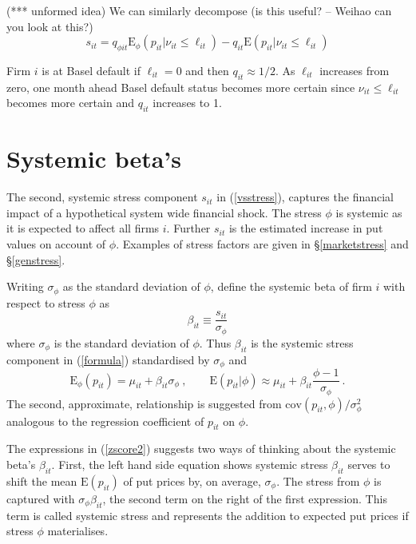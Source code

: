 \documentclass[authoryear]{elsarticle}
\newcommand{\E}{\mathrm{E}}
\newcommand{\cov}{\mathrm{cov}}
\newcommand{\Es}{\E_\phi}
\newcommand{\eref}[1]{(\ref{#1})}
\newcommand{\sref}[1]{\S\ref{#1}}
\newcommand{\cq}{\ , \qquad}
\newcommand{\be}[1]{\begin{equation}\label{#1}}
\newcommand{\ee}{\end{equation}}
\begin{document}
(*** unformed idea)   We can similarly decompose   (is this useful? -- Weihao can you look at this?)
$$
s_{it} = q_{\phi it}\E_\phi(p_{it}|\nu_{it}\le \ell_{it})-q_{it}\E(p_{it}|\nu_{it} \le \ell_{it})
$$      

Firm $i$ is at Basel default if $\ell_{it}=0$  and then  $q_{it}\approx 1/2$.   As  $\ell_{it}$ increases from zero,  one month ahead Basel default status  becomes more certain since $\nu_{it}\le \ell_{it}$ becomes more certain and $q_{it}$ increases to 1. 

   

  
   
\section{Systemic beta's}

The second, systemic stress component $s_{it}$ in  \eref{vsstress},  captures the financial impact of a  hypothetical system wide financial shock.   The stress $\phi$ is systemic as it is expected to affect all firms $i$.  Further $s_{it}$ is the estimated   increase in put values on account of  $\phi$.   Examples of stress factors are given in \sref{marketstress} and \sref{genstress}.
 

Writing  $\sigma_{\phi}$ as the standard deviation of $\phi$,  define the systemic beta of firm $i$ with respect to stress $\phi$ as
\be{zscore}
\beta_{it}\equiv \frac{s_{it}}{\sigma_\phi}
\ee
where  $\sigma_\phi$ is the standard deviation of $\phi$.   Thus $\beta_{it}$ is the systemic stress component in \eref{formula} standardised by $\sigma_\phi$ and
\be{zscore2}
\Es(p_{it})  = \mu_{it} + \beta_{it}\sigma_\phi\cq \E(p_{it}|\phi) \approx \mu_{it} + \beta_{it}\frac{\phi-1}{\sigma_\phi}\ .
\ee
The second, approximate, relationship is suggested from   $\cov(p_{it},\phi)/\sigma^2_\phi$ analogous to the regression coefficient of $p_{it}$ on $\phi$.

The expressions in \eref{zscore2} suggests two ways of  thinking about the  systemic beta's  $\beta_{it}$.   First, the left hand side equation shows systemic stress $\beta_{it}$ serves to shift the mean $\E(p_{it})$ of put prices  by, on average, $\sigma_\phi$.    The stress from $\phi$ is captured with $\sigma_\phi\beta_{it}$, the second term on the right of the first expression.   This term is called systemic stress and represents the addition to expected put prices if stress $\phi$ materialises.  
\end{document}
